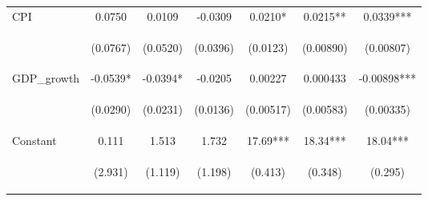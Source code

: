 \begin{tabular}{lcccccc}
CPI & 0.0750 & 0.0109 & -0.0309 & 0.0210* & 0.0215** & 0.0339*** \\
\vspace{4pt} & \begin{footnotesize}(0.0767)\end{footnotesize} & \begin{footnotesize}(0.0520)\end{footnotesize} & \begin{footnotesize}(0.0396)\end{footnotesize} & \begin{footnotesize}(0.0123)\end{footnotesize} & \begin{footnotesize}(0.00890)\end{footnotesize} & \begin{footnotesize}(0.00807)\end{footnotesize} \\
GDP\_growth & -0.0539* & -0.0394* & -0.0205 & 0.00227 & 0.000433 & -0.00898*** \\
\vspace{4pt} & \begin{footnotesize}(0.0290)\end{footnotesize} & \begin{footnotesize}(0.0231)\end{footnotesize} & \begin{footnotesize}(0.0136)\end{footnotesize} & \begin{footnotesize}(0.00517)\end{footnotesize} & \begin{footnotesize}(0.00583)\end{footnotesize} & \begin{footnotesize}(0.00335)\end{footnotesize} \\
Constant & 0.111 & 1.513 & 1.732 & 17.69*** & 18.34*** & 18.04*** \\
 & \begin{footnotesize}(2.931)\end{footnotesize} & \begin{footnotesize}(1.119)\end{footnotesize} & \begin{footnotesize}(1.198)\end{footnotesize} & \begin{footnotesize}(0.413)\end{footnotesize} & \begin{footnotesize}(0.348)\end{footnotesize} & \begin{footnotesize}(0.295)\end{footnotesize} \\

\end{tabular}
